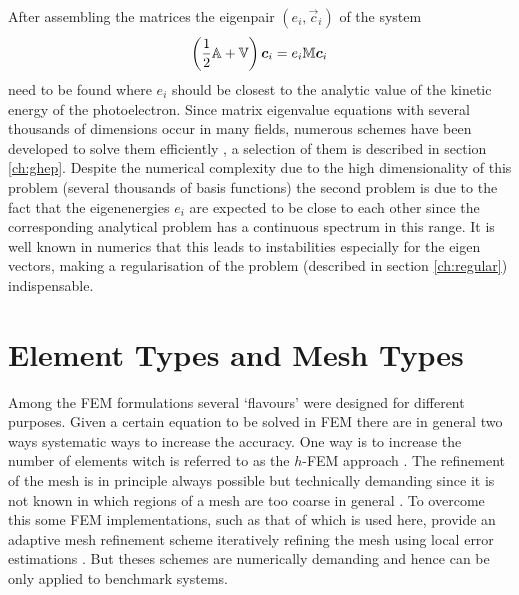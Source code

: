 After assembling the matrices the eigenpair $(e_i, \vec{c}_i)$ of the system
\begin{equation} \label{eq:SEmat2}
\left(\frac 12 \mathbb{A}+\mathbb{V}\right)\bm{c}_i = e_i \mathbb{M}\bm{c}_i
\end{equation}
need to be found where $e_i$ should be closest to the analytic value of the kinetic energy of the photoelectron.
Since matrix eigenvalue equations with several thousands of dimensions occur in many fields, numerous schemes have been developed to solve them efficiently \cite{davidson,arnoldi, gpusolver,krylov}, a selection of them is described in section \ref{ch:ghep}.
Despite the numerical complexity due to the high dimensionality of this problem (several thousands of basis functions) the second problem is due to the fact that the eigenenergies $e_i$ are expected to be close to each other since the corresponding analytical problem has a continuous spectrum in this range.
It is well known in numerics that this leads to instabilities especially for the eigen vectors, making a regularisation of the problem (described in section \ref{ch:regular}) indispensable.

\section{Element Types and Mesh Types}
\label{ch:feAss}
Among the FEM formulations several `flavours' were designed for different purposes.
Given a certain equation to be solved in FEM there are in general two ways systematic ways to increase the accuracy.
One way is to increase the number of elements witch is referred to as the $h$-FEM approach \cite{dreyer,}.
The refinement of the mesh is in principle always possible but technically demanding since it is not known in which regions of a mesh are too coarse in general \cite{dreyer}.
To overcome this some FEM implementations, such as that of  \cite{libmesh} which is used here, provide an adaptive mesh refinement scheme iteratively refining the mesh using local error estimations \cite{libmesh}.
But theses schemes are numerically demanding and hence can be only applied to benchmark systems.

